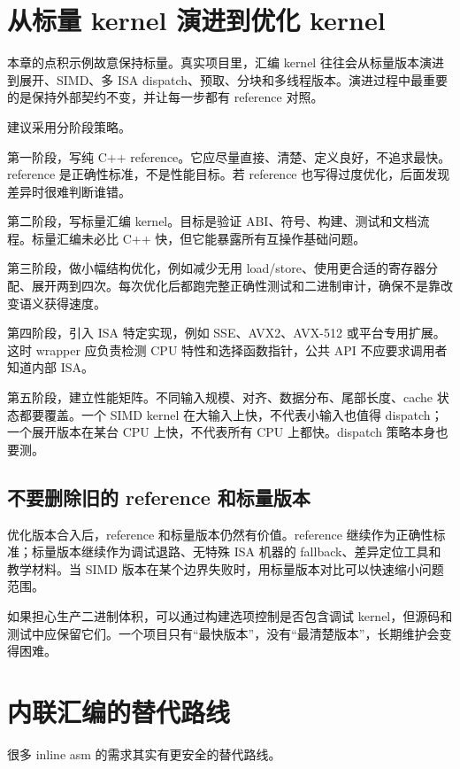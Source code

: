 \section{从标量 kernel 演进到优化 kernel}

本章的点积示例故意保持标量。真实项目里，汇编 kernel 往往会从标量版本演进到展开、SIMD、多 ISA dispatch、预取、分块和多线程版本。演进过程中最重要的是保持外部契约不变，并让每一步都有 reference 对照。

建议采用分阶段策略。

第一阶段，写纯 C++ reference。它应尽量直接、清楚、定义良好，不追求最快。reference 是正确性标准，不是性能目标。若 reference 也写得过度优化，后面发现差异时很难判断谁错。

第二阶段，写标量汇编 kernel。目标是验证 ABI、符号、构建、测试和文档流程。标量汇编未必比 C++ 快，但它能暴露所有互操作基础问题。

第三阶段，做小幅结构优化，例如减少无用 load/store、使用更合适的寄存器分配、展开两到四次。每次优化后都跑完整正确性测试和二进制审计，确保不是靠改变语义获得速度。

第四阶段，引入 ISA 特定实现，例如 SSE、AVX2、AVX-512 或平台专用扩展。这时 wrapper 应负责检测 CPU 特性和选择函数指针，公共 API 不应要求调用者知道内部 ISA。

第五阶段，建立性能矩阵。不同输入规模、对齐、数据分布、尾部长度、cache 状态都要覆盖。一个 SIMD kernel 在大输入上快，不代表小输入也值得 dispatch；一个展开版本在某台 CPU 上快，不代表所有 CPU 上都快。dispatch 策略本身也要测。

\subsection{不要删除旧的 reference 和标量版本}

优化版本合入后，reference 和标量版本仍然有价值。reference 继续作为正确性标准；标量版本继续作为调试退路、无特殊 ISA 机器的 fallback、差异定位工具和教学材料。当 SIMD 版本在某个边界失败时，用标量版本对比可以快速缩小问题范围。

如果担心生产二进制体积，可以通过构建选项控制是否包含调试 kernel，但源码和测试中应保留它们。一个项目只有“最快版本”，没有“最清楚版本”，长期维护会变得困难。

\section{内联汇编的替代路线}

很多 inline asm 的需求其实有更安全的替代路线。

